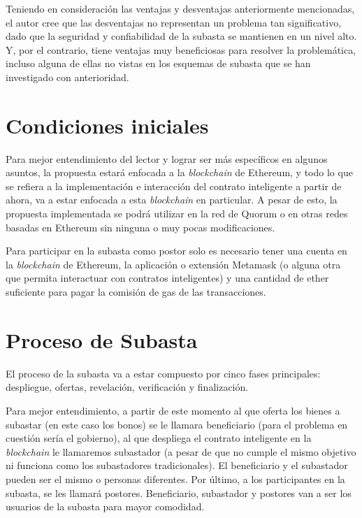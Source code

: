     Teniendo en consideración las ventajas y desventajas anteriormente mencionadas, el autor cree que las desventajas no representan un
    problema tan significativo, dado que la seguridad y confiabilidad de la subasta se mantienen en un nivel alto. Y, por el contrario, tiene
    ventajas muy beneficiosas para resolver la problemática, incluso alguna de ellas no vistas en los esquemas de subasta que se han 
    investigado con anterioridad.

    \section{Condiciones iniciales}
    Para mejor entendimiento del lector y lograr ser más específicos en algunos asuntos, la propuesta estará enfocada a la \textit{blockchain} de
    Ethereum, y todo lo que se refiera a la implementación e interacción del contrato inteligente a partir de ahora, va a estar enfocada
    a esta \textit{blockchain} en particular. A pesar de esto, la propuesta implementada se podrá utilizar en la red de Quorum o en otras redes basadas
    en Ethereum sin ninguna o muy pocas modificaciones.

    Para participar en la subasta como postor solo es necesario tener una cuenta en la \textit{blockchain} de Ethereum, la aplicación o extensión
    Metamask (o alguna otra que permita interactuar con contratos inteligentes) y una cantidad de ether suficiente para pagar la comisión
    de gas de las transacciones.

    \section{Proceso de Subasta}
    El proceso de la subasta va a estar compuesto por cinco fases principales: despliegue, ofertas, revelación,
    verificación y finalización.

    Para mejor entendimiento, a partir de este momento al que oferta los bienes a subastar (en este caso los bonos) se le llamara 
    beneficiario (para el problema en cuestión sería el gobierno), al que despliega el contrato inteligente en la \textit{blockchain} le llamaremos 
    subastador (a pesar de que no cumple el mismo objetivo ni funciona como los subastadores tradicionales). El beneficiario y el 
    subastador pueden ser el mismo o personas diferentes. Por último, a los participantes en la subasta, se les llamará postores. 
    Beneficiario, subastador y postores van a ser los usuarios de la subasta para mayor comodidad.

